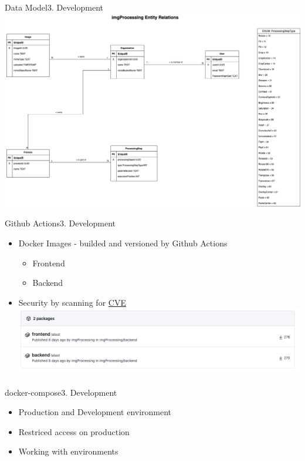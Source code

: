 \documentclass[aspectratio=169,20pt]{beamer}
\begin{document}
\begin{frame}{Data Model}{3. Development}
	\includegraphics[scale=0.45]{db_model}
\end{frame}

\begin{frame}{Github Actions}{3. Development}
	\begin{itemize}
		\item{Docker Images - builded and versioned by Github Actions}
		\begin{itemize}
			\item{Frontend}
			\item{Backend}
		\end{itemize}
		\item{Security by scanning for \href{https://github.com/marketplace/actions/container-image-scan/}{CVE}}
		\includegraphics[scale=0.8]{action}
	\end{itemize}
\end{frame}

\begin{frame}{docker-compose}{3. Development}
	\begin{itemize}
		\item{Production and Development environment}
		\item{Restriced access on production}
		\item{Working with environments}
	\end{itemize}
\end{frame}
\end{document}
